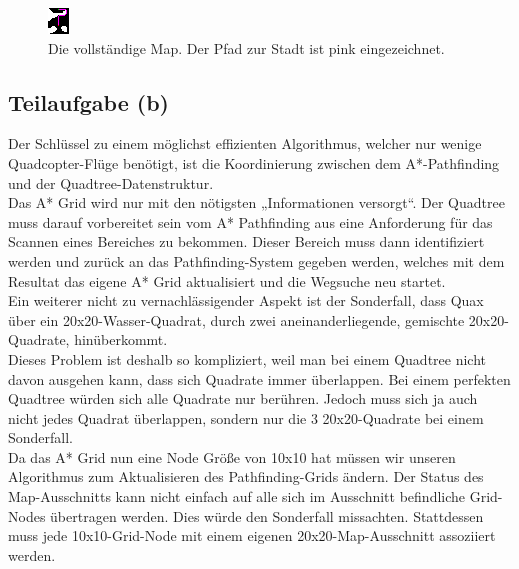 \documentclass[a4paper,12pt]{article}
\begin{document}
\begin{figure}[H]
\centering
    \includegraphics[width=.5\linewidth]{Bilder/Aufgabe3/Teilaufgabe_A/Beispiel_04.png}
    \caption{Die vollständige Map. Der Pfad zur Stadt ist pink eingezeichnet.}
\end{figure}

\subsection{Teilaufgabe (b)}
Der Schlüssel zu einem möglichst effizienten Algorithmus, welcher nur wenige Quadcopter-Flüge benötigt, ist die Koordinierung zwischen dem A*-Pathfinding und der Quadtree-Datenstruktur.
\\[0.4cm]
Das A* Grid wird nur mit den nötigsten „Informationen versorgt“.
Der Quadtree muss darauf vorbereitet sein vom A* Pathfinding aus eine Anforderung für das Scannen eines Bereiches zu bekommen. Dieser Bereich muss dann identifiziert werden und zurück an das Pathfinding-System gegeben werden, welches mit dem Resultat das eigene A* Grid aktualisiert und die Wegsuche neu startet.
\\[0.4cm]
Ein weiterer nicht zu vernachlässigender Aspekt ist der Sonderfall, dass Quax über ein 20x20-Wasser-Quadrat, durch zwei aneinanderliegende, gemischte 20x20-Quadrate, hinüberkommt.
\\[0.4cm]
Dieses Problem ist deshalb so kompliziert, weil man bei einem Quadtree nicht davon ausgehen kann, dass sich Quadrate immer überlappen. Bei einem perfekten Quadtree würden sich alle Quadrate nur berühren. Jedoch muss sich ja auch nicht jedes Quadrat überlappen, sondern nur die 3 20x20-Quadrate bei einem Sonderfall.
\\[0.4cm]
Da das A* Grid nun eine Node Größe von 10x10 hat müssen wir unseren Algorithmus zum Aktualisieren des Pathfinding-Grids ändern. Der Status des Map-Ausschnitts kann nicht einfach auf alle sich im Ausschnitt befindliche Grid-Nodes übertragen werden. Dies würde den Sonderfall missachten. Stattdessen muss jede 10x10-Grid-Node mit einem eigenen 20x20-Map-Ausschnitt assoziiert werden. 
\end{document}
